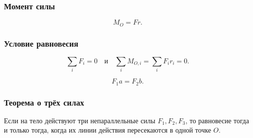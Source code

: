 \documentclass[12pt, a4paper]{article}
\begin{document}
\subsubsection*{Момент силы}

\[
M_O = Fr.
\]

\subsubsection*{Условие равновесия}

\[
\sum_i F_i = 0
\quad\text{и}\quad
\sum_i M_{O,i} = \sum_i F_i r_i = 0.
\]

\[
F_1 a = F_2 b.
\]

\subsubsection*{Теорема о трёх силах}

Если на тело действуют три непараллельные силы \(F_1, F_2, F_3\), то равновесие тогда и только тогда, когда их линии действия пересекаются в одной точке \(O\).
\end{document}
